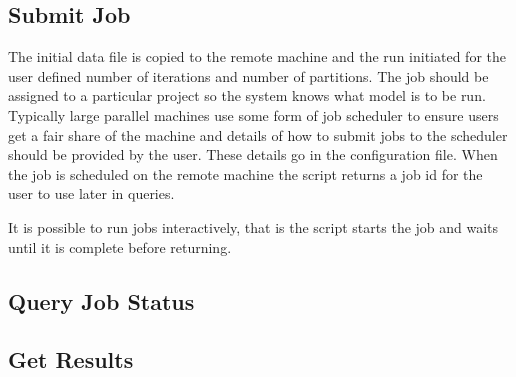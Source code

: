 \subsection{Submit Job}

The initial data file is copied to the remote machine and the run initiated for the user defined number of iterations and number of partitions. The job should be assigned to a particular project so the system knows what model is to be run.  Typically large parallel machines use some form of job scheduler to ensure users get a fair share of the machine and details of how to submit jobs to the scheduler should be provided by the user. These details go in the configuration file. When the job is scheduled on the remote machine the script returns a job id for the user to use later in queries.

It is possible to run jobs interactively, that is the script starts the job and waits until it is complete before returning.



\subsection{Query Job Status}

\subsection{Get Results}


